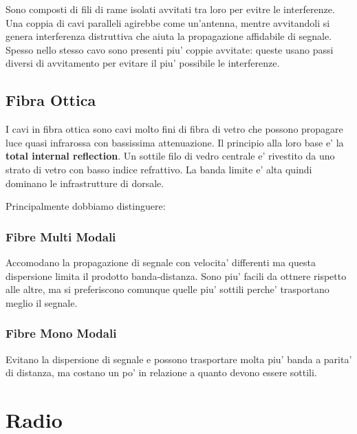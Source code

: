 Sono composti di fili di rame isolati avvitati tra loro per evitre le interferenze. Una coppia di cavi paralleli agirebbe come un'antenna, mentre avvitandoli si genera interferenza distruttiva che aiuta la propagazione affidabile di segnale.
Spesso nello stesso cavo sono presenti piu' coppie avvitate: queste usano passi diversi di avvitamento per evitare il piu' possibile le interferenze.


\subsection{Fibra Ottica}

I cavi in fibra ottica sono cavi molto fini di fibra di vetro che possono propagare luce quasi infrarossa con bassissima attenuazione.
Il principio alla loro base e' la \textbf{total internal reflection}. Un sottile filo di vedro centrale e' rivestito da uno strato di vetro con basso indice refrattivo.
La banda limite e' alta quindi dominano le infrastrutture di dorsale.


Principalmente dobbiamo distinguere:

\subsubsection{Fibre Multi Modali}

Accomodano la propagazione di segnale con velocita' differenti ma questa dispersione limita il prodotto banda-distanza.
Sono piu' facili da ottnere rispetto alle altre, ma si preferiscono comunque quelle piu' sottili perche' trasportano meglio il segnale.


\subsubsection{Fibre Mono Modali}

Evitano la dispersione di segnale e possono trasportare molta piu' banda a parita' di distanza, ma costano un po' in relazione a quanto devono essere sottili.


\section{Radio}


